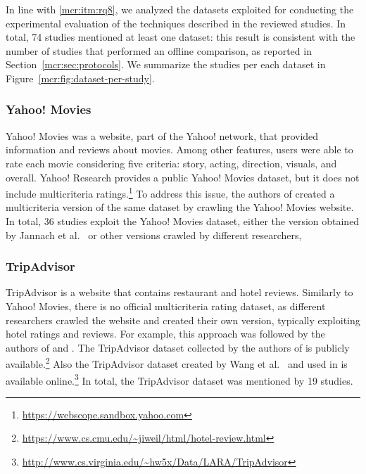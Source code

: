 In line with \ref{mcr:itm:rq8}, we analyzed the datasets exploited for conducting the experimental evaluation of the techniques described in the reviewed studies. In total, 74 studies mentioned at least one dataset: this result is consistent with the number of studies that performed an offline comparison, as reported in Section~\ref{mcr:sec:protocols}. We summarize the studies per each dataset in Figure~\ref{mcr:fig:dataset-per-study}.

\subsubsection{Yahoo! Movies}

Yahoo! Movies was a website, part of the Yahoo! network, that provided information and reviews about movies. Among other features, users were able to rate each movie considering five criteria: story, acting, direction, visuals, and overall. Yahoo! Research provides a public Yahoo! Movies dataset, but it does not include multicriteria ratings.\footnote{\url{https://webscope.sandbox.yahoo.com}} To address this issue, the authors of  created a multicriteria version of the same dataset by crawling the Yahoo! Movies website. In total, 36 studies exploit the Yahoo! Movies dataset, either the version obtained by Jannach et al.~ or other versions crawled by different researchers, 

\subsubsection{TripAdvisor}

TripAdvisor is a website that contains restaurant and hotel reviews. Similarly to Yahoo! Movies, there is no official multicriteria rating dataset, as different researchers crawled the website and created their own version, typically exploiting hotel ratings and reviews. For example, this approach was followed by the authors of  and . The TripAdvisor dataset collected by the authors of  is publicly available.\footnote{\url{https://www.cs.cmu.edu/~jiweil/html/hotel-review.html}} Also the TripAdvisor dataset created by Wang et al.~\cite{Wang2010} and used in  is available online.\footnote{\url{http://www.cs.virginia.edu/~hw5x/Data/LARA/TripAdvisor}} In total, the TripAdvisor dataset was mentioned by 19 studies.

